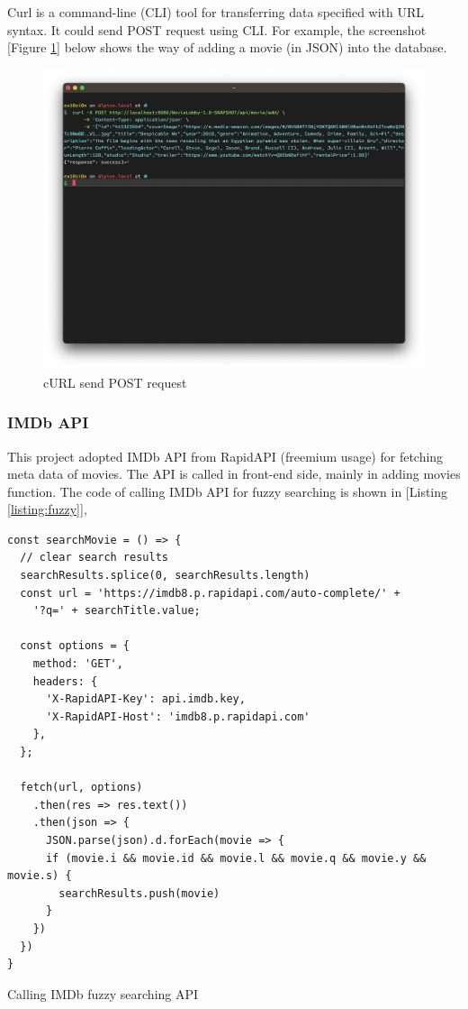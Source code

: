 \documentclass{article}
\begin{document}
Curl is a command-line (CLI) tool for transferring data specified with URL syntax. It could send POST request using CLI. For example, the screenshot [Figure \ref{fig:curl}] below shows the way of adding a movie (in JSON) into the database.

\begin{figure}[!htp]
\centering
\includegraphics[width=1\textwidth]{curl.png}
\caption{\label{fig:curl}cURL send POST request}
\end{figure}

\subsubsection{IMDb API}

This project adopted IMDb API from RapidAPI (freemium usage) for fetching meta data of movies. The API is called in front-end side, mainly in adding movies function. The code of calling IMDb API for fuzzy searching is shown in [Listing \ref{listing:fuzzy}], 

\begin{listing}[!htp]
\begin{verbatim}
const searchMovie = () => {
  // clear search results
  searchResults.splice(0, searchResults.length)
  const url = 'https://imdb8.p.rapidapi.com/auto-complete/' +
    '?q=' + searchTitle.value;

  const options = {
    method: 'GET',
    headers: {
      'X-RapidAPI-Key': api.imdb.key,
      'X-RapidAPI-Host': 'imdb8.p.rapidapi.com'
    },
  };

  fetch(url, options)
    .then(res => res.text())
    .then(json => {
      JSON.parse(json).d.forEach(movie => {
      if (movie.i && movie.id && movie.l && movie.q && movie.y && movie.s) {
        searchResults.push(movie)
      }
    })
  })
}
\end{verbatim}
\caption{Calling IMDb fuzzy searching API}
\label{listing:fuzzy}
\end{listing}
\end{document}
